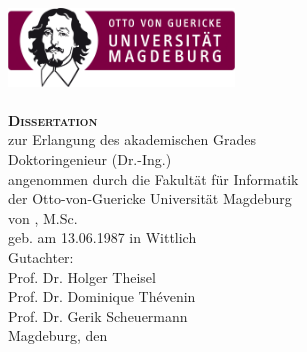\begin{titlepage}
\setlength{\parindent}{0cm}%
\begin{Large}
\begin{centering}
\includegraphics[width=6cm]{figures/OvGU-Logo.jpg}\\
\vspace*{2cm}
{\scshape\bfseries\huge \thetitle}\\
\vspace*{2\baselineskip}
{\scshape\bfseries\LARGE Dissertation}\\
\vspace*{\baselineskip}
zur Erlangung des akademischen Grades\\
\vspace*{\baselineskip}
Doktoringenieur (Dr.-Ing.)\\
\vfill
angenommen durch die Fakultät für Informatik\\
der Otto-von-Guericke Universität Magdeburg\\
\vspace*{\baselineskip}
von \theauthor, M.Sc.\\
geb. am 13.06.1987 in Wittlich\\
\vspace*{\baselineskip}
Gutachter:\\
Prof. Dr. Holger Theisel\\
Prof. Dr. Dominique Th\'evenin\\
Prof. Dr. Gerik Scheuermann\\
\vspace*{\baselineskip}
Magdeburg, den \thedate\\
\end{centering}
\end{Large}
\end{titlepage}